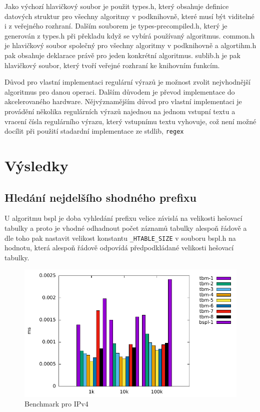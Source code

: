 Jako výchozí hlavičkový soubor je použit types.h, který obsahuje definice datových struktur pro všechny algoritmy v podknihovně, které musí být viditelné i z veřejného rozhraní. Dalším souborem je types-precompiled.h, který je generován z types.h při překladu když se vybírá používaný algoritmus. common.h je hlavičkový soubor společný pro všechny algoritmy v podknihovně a algortihm.h pak obsahuje deklarace právě pro jeden konkrétní algoritmus.
sublib.h je pak hlavičkový soubor, který tvoří veřejné rozhraní ke knihovním funkcím.



Důvod pro vlastní implementaci regulární výrazů je možnost zvolit nejvhodnější algoritmus pro danou operaci.
Dalším důvodem je převod implementace do akcelerovaného hardware.
Nějvýznamějším důvod pro vlastní implementaci je provádění několika regulárních výrazů najednou na jednom vstupní textu a vracení čísla regulárního výrazu, který vstupnímu textu vyhovuje, což není možné docílit při použití stadardní implementace ze stdlib, {\tt regex}

\chapter{Výsledky}
\section{Hledání nejdelšího shodného prefixu}
U algoritmu bspl je doba vyhledání prefixu velice závislá na velikosti hešovací tabulky a proto je vhodné odhadnout počet záznamů tabulky alespoň řádově a dle toho pak nastavit velikost konstantu {\tt \_HTABLE\_SIZE} v souboru bspl.h na hodnotu, která alespoň řádově odpovídá předpodkládané velikosti hešovací tabulky.

\begin{figure}[!htb]
\centering
\includegraphics[scale=1]{fig/lpm-ipv4.pdf}
\caption{Benchmark pro IPv4}
\label{fig:lpm-ipv4}
\end{figure}

